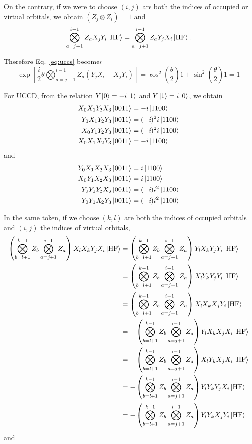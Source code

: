 \documentclass[11pt, oneside]{article}   	%
\begin{document}
On the contrary, if we were to choose $(i, j)$ are both the indices of occupied or virtual orbitals, we obtain $(Z_j \otimes Z_i) = 1$ and 
\begin{align}
\bigotimes^{i-1}_{a=j+1} Z_a X_j Y_i \ket{\mathrm{HF}} 
= \bigotimes^{i-1}_{a=j+1} Z_a Y_j X_i \ket{\mathrm{HF}}.
\end{align}

Therefore Eq.~\ref{eq:uccs} becomes
\begin{equation}
\exp \left[ \frac{i}{2} \theta \bigotimes^{i-1}_{a=j+1} Z_a  (Y_j X_i - X_j Y_i) \right] 
= \cos^2 \left( \frac{\theta}{2} \right) 1 +  \sin^2 \left( \frac{\theta}{2} \right) 1
= 1
\end{equation}

For UCCD, from the relation $Y \ket{0} = -i \ket{1}$ and $Y \ket{1} = i \ket{0}$, we obtain
\begin{align}
X_0 X_1 Y_2 X_3 \ket{0011} &= - i \ket{1100} \\
Y_0 X_1 Y_2 Y_3 \ket{0011} &= (-i)^2 i \ket{1100} \\
X_0 Y_1 Y_2 Y_3 \ket{0011} &= (-i)^2 i \ket{1100} \\
X_0 X_1 X_2 Y_3 \ket{0011} &= - i \ket{1100}
\end{align}
and 
\begin{align}
Y_0 X_1 X_2 X_3 \ket{0011} &= i \ket{1100} \\
X_0 Y_1 X_2 X_3 \ket{0011} &= i \ket{1100} \\
Y_0 Y_1 Y_2 X_3 \ket{0011} &= (-i) i^2 \ket{1100} \\
Y_0 Y_1 X_2 Y_3 \ket{0011} &= (-i) i^2 \ket{1100}
\end{align}

In the same token, if we choose $(k, l)$ are both the indices of occupied orbitals and $(i, j)$ the indices of virtual orbitals, 
\begin{align}
\left( \bigotimes^{k-1}_{b=l+1} Z_b \bigotimes^{i-1}_{a=j+1} Z_a \right) X_l X_k Y_j X_i \ket{\mathrm{HF}}
& = \left( \bigotimes^{k-1}_{b=l+1} Z_b \bigotimes^{i-1}_{a=j+1} Z_a \right) Y_l X_k Y_j Y_i \ket{\mathrm{HF}} \\
& = \left( \bigotimes^{k-1}_{b=l+1} Z_b \bigotimes^{i-1}_{a=j+1} Z_a \right) X_l Y_k Y_j Y_i \ket{\mathrm{HF}} \\
& = \left( \bigotimes^{k-1}_{b=l+1} Z_b \bigotimes^{i-1}_{a=j+1} Z_a \right) X_l X_k X_j Y_i \ket{\mathrm{HF}} \\
& = - \left( \bigotimes^{k-1}_{b=l+1} Z_b \bigotimes^{i-1}_{a=j+1} Z_a \right) Y_l X_k X_j X_i \ket{\mathrm{HF}} \\
& = - \left( \bigotimes^{k-1}_{b=l+1} Z_b \bigotimes^{i-1}_{a=j+1} Z_a \right) X_l Y_k X_j X_i \ket{\mathrm{HF}} \\
& = - \left( \bigotimes^{k-1}_{b=l+1} Z_b \bigotimes^{i-1}_{a=j+1} Z_a \right) Y_l Y_k Y_j X_i \ket{\mathrm{HF}} \\
& = - \left( \bigotimes^{k-1}_{b=l+1} Z_b \bigotimes^{i-1}_{a=j+1} Z_a \right) Y_l Y_k X_j Y_i \ket{\mathrm{HF}}
\end{align}
and 
\end{document}
